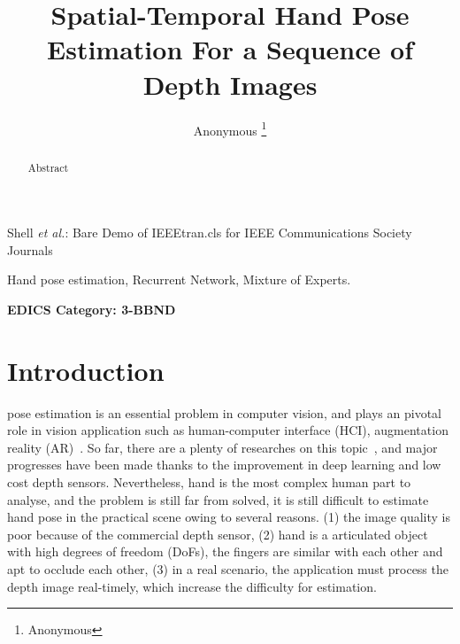 \documentclass[journal,comsoc]{IEEEtran}
\begin{document}
\title{Spatial-Temporal Hand Pose Estimation For a Sequence of Depth Images}

\author{{Anonymous}%
\thanks{Anonymous}}

%
{Shell \MakeLowercase{\textit{et al.}}: Bare Demo of IEEEtran.cls for IEEE Communications Society Journals}

\maketitle

\begin{abstract}
Abstract
\end{abstract}

\begin{IEEEkeywords}
Hand pose estimation, Recurrent Network, Mixture of Experts.
\end{IEEEkeywords}


\ifCLASSOPTIONpeerreview
\begin{center} \bfseries EDICS Category: 3-BBND \end{center}
\fi
%
\IEEEpeerreviewmaketitle


\section{Introduction}\label{sec:introduction}
 pose estimation is an essential problem in computer vision, and plays an pivotal
role in vision application such as human-computer interface (HCI), augmentation reality (AR)~\cite{barsoum2016articulated}. So
far, there are a plenty of researches on this topic~\cite{guo2017region, quach2016depth, ge2017_3D,
wan2017crossing}, and major progresses have been made thanks to the improvement in deep learning
and low cost depth sensors. Nevertheless, hand is the most complex human part to analyse, and the
problem is still far from solved, it is still difficult to estimate hand pose in the practical scene
owing to several reasons. (1) the image quality is poor because of the commercial depth sensor, (2)
hand is a articulated object with high degrees of freedom (DoFs), the fingers are similar with each
other and apt to occlude each other, (3) in a real scenario, the application must process the depth
image real-timely, which increase the difficulty for estimation.
\end{document}
